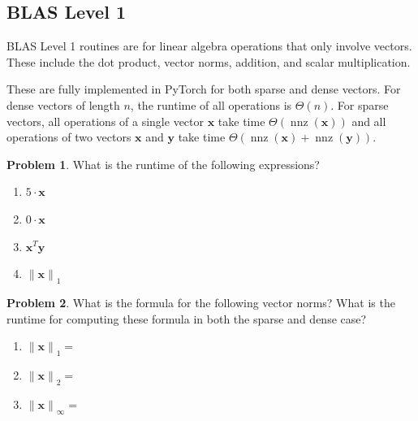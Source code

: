 \documentclass[10pt]{article}
\theoremstyle{definition}
\newtheorem{problem}{Problem}
\DeclareMathOperator{\nnz}{nnz}
\newcommand{\trans}[1]{{#1}^{T}}
\newcommand{\x}{\mathbf x}
\newcommand{\y}{\mathbf y}
\newcommand{\lone}[1]{{\lVert {#1} \rVert}_1}
\newcommand{\ltwo}[1]{{\lVert {#1} \rVert}_2}
\newcommand{\lp}[1]{{\lVert {#1} \rVert}_p}
\newcommand{\linf}[1]{{\lVert {#1} \rVert}_\infty}
\begin{document}
\newpage
\subsection{BLAS Level 1}

BLAS Level 1 routines are for linear algebra operations that only involve vectors.
These include the dot product, vector norms, addition, and scalar multiplication.

These are fully implemented in PyTorch for both sparse and dense vectors.
For dense vectors of length $n$, the runtime of all operations is $\Theta(n)$.
For sparse vectors, all operations of a single vector $\x$ take time $\Theta(\nnz(\x))$
and all operations of two vectors $\x$ and $\y$ take time $\Theta(\nnz(\x)+\nnz(\y))$.

\begin{problem}
    What is the runtime of the following expressions?
    \begin{enumerate}
        \item $5 \cdot \x$
            \vspace{2in}
        \item $0 \cdot \x$
            \vspace{2in}
        \item $\trans\x \y$
            \vspace{2in}
        \item $\lone{\x}$
            \vspace{2in}
    \end{enumerate}
\end{problem}

\begin{problem}
    What is the formula for the following vector norms?
    What is the runtime for computing these formula in both the sparse and dense case?
    \begin{enumerate}
        \item $\lone{\x}=$
            \vspace{2in}
        \item $\ltwo{\x}=$
            \vspace{2in}
        \item $\linf{\x}=$
            \vspace{2in}
    \end{enumerate}
\end{problem}
\end{document}
